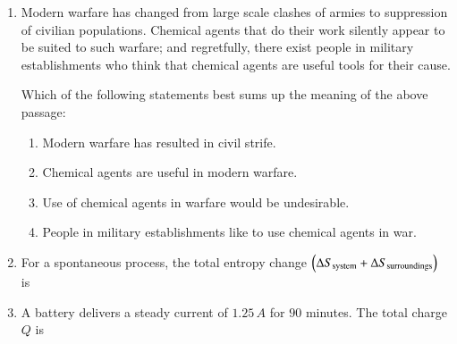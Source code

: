 \documentclass[journal,12pt,onecolumn]{IEEEtran}
\theoremstyle{remark}
\begin{document}
\begin{enumerate}
\item Modern warfare has changed from large scale clashes of armies to suppression of civilian populations. Chemical agents that do their work silently appear to be suited to such warfare; and regretfully, there exist people in military establishments who think that chemical agents are useful tools for their cause.  

Which of the following statements best sums up the meaning of the above passage:  

\hfill{}

\begin{enumerate}
\item Modern warfare has resulted in civil strife.  
\item Chemical agents are useful in modern warfare.  
\item Use of chemical agents in warfare would be undesirable.  
\item People in military establishments like to use chemical agents in war.  
\end{enumerate}

\item For a spontaneous process, the total entropy change $\brak{\Delta S_{\text{system}} + \Delta S_{\text{surroundings}}}$ is  

\hfill{}

\begin{enumerate}
\end{enumerate}

\item A battery delivers a steady current of $1.25 \, A$ for $90$ minutes. The total charge $Q$  is  

\hfill{}

\begin{enumerate}
\end{enumerate}


\end{enumerate}
\end{document}
